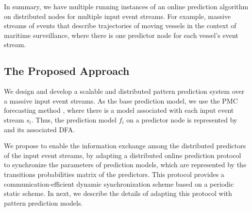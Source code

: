 \par In summary, we have multiple running instances of an online prediction algorithm on distributed nodes for multiple input event streams. For example, massive streams of events that describe trajectories of moving vessels in the context of maritime surveillance, where there is one predictor node for each vessel's event stream.
  
%

\subsection{The Proposed Approach}
\label{sec:proposed_approach}
\par We design and develop a scalable and distributed pattern prediction system over a massive input event streams. As the base prediction model, we use the PMC forecasting method \cite{alevizos2017event}, where there is a \pmcmr model associated with each input event stream $s_i$. Thus, the prediction model $f_i$ on a predictor node is represented by \pmcmr and its associated DFA.

\par We propose to enable the information exchange among the distributed predictors of the input event streams, by adapting a distributed online prediction protocol \cite{kamp2014communication} to synchronize the parameters of prediction models, which are represented by the transitions probabilities matrix of the \pmcmr predictors. This protocol provides a communication-efficient dynamic synchronization scheme based on a periodic static scheme. In next, we  describe the details of adapting this protocol with pattern prediction models.


